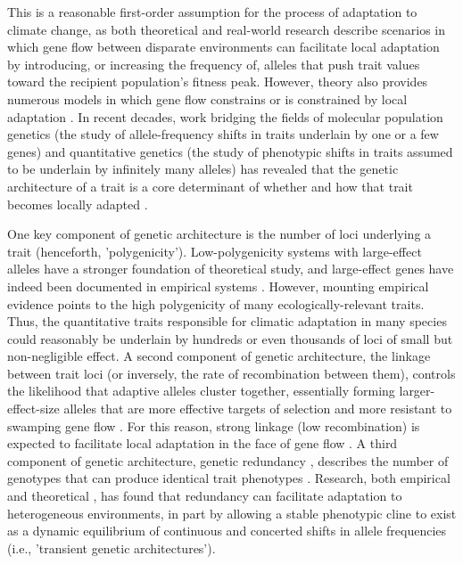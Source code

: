 \documentclass[9pt,twocolumn,twoside,lineno]{pnas-new}
\begin{document}
This is a reasonable first-order assumption
for the process of adaptation to climate change,
as both theoretical
\cite{aitken_whitlock,slatkin,tigano}
and real-world \cite{feder,bell} research describe scenarios in which
gene flow between disparate environments can facilitate local adaptation
by introducing, or increasing the frequency of, alleles 
that push trait values toward
the recipient population's fitness peak.
However, theory also provides numerous models
in which gene flow constrains or is constrained by
local adaptation
\cite{wang,lenormand,slatkin,haldane,wright,felsenstein}.
In recent decades, work bridging the fields
of molecular population genetics
(the study of allele-frequency shifts
in traits underlain by one or a few genes)
and quantitative genetics
(the study of phenotypic shifts in
traits assumed to be underlain by infinitely many alleles)
\cite{barghi_polygenic,barton,pritchard_human_adaptation,pritchard_sweeps_alone}
has revealed that the genetic architecture of a trait
is a core determinant of whether and how that trait
becomes locally adapted \cite{yeaman_review}. 

One key component of genetic architecture is the number of loci 
underlying a trait (henceforth, 'polygenicity'). 
Low-polygenicity systems with large-effect alleles
have a stronger foundation of theoretical study,
and large-effect genes have indeed been documented in empirical systems \cite{martin,rees}.
However, mounting empirical evidence points to the high polygenicity 
of many ecologically-relevant traits\cite{boyle,rockman,savolainen,sella,barghi_polygenic}.
Thus, the quantitative traits responsible for climatic adaptation in many species could reasonably be 
underlain by hundreds or even thousands of loci of small but non-negligible effect.
A second component of genetic architecture, the linkage between trait loci
(or inversely, the rate of recombination between them),
controls the likelihood that adaptive alleles cluster together,
essentially forming larger-effect-size alleles that are more 
effective targets of selection and more resistant
to swamping gene flow \cite{yeaman_whitlock}.
For this reason, strong linkage (low recombination)
is expected to facilitate local
adaptation in the face of gene flow \cite{tigano}.
A third component of genetic architecture,
genetic redundancy \cite{barghi_polygenic,laruson},
describes the number of genotypes
that can produce identical trait phenotypes \cite{yeaman_review,laruson,barghi_polygenic}.
Research, both empirical \cite{barghi_redundancy,manceau} and theoretical \cite{yeaman_amnat},
has found that redundancy can facilitate
adaptation to heterogeneous environments, in part by
allowing a stable phenotypic cline to exist as a dynamic equilibrium
of continuous and concerted shifts in allele frequencies
(i.e., 'transient genetic architectures').
\end{document}
